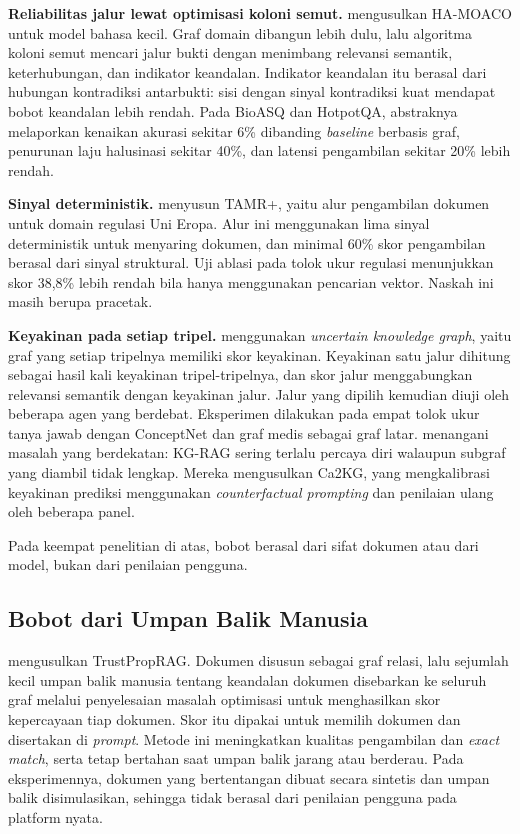 \textbf{Reliabilitas jalur lewat optimisasi koloni semut.} \textcite{Asghari2026} mengusulkan HA-MOACO untuk model bahasa kecil. Graf domain dibangun lebih dulu, lalu algoritma koloni semut mencari jalur bukti dengan menimbang relevansi semantik, keterhubungan, dan indikator keandalan. Indikator keandalan itu berasal dari hubungan kontradiksi antarbukti: sisi dengan sinyal kontradiksi kuat mendapat bobot keandalan lebih rendah. Pada BioASQ dan HotpotQA, abstraknya melaporkan kenaikan akurasi sekitar 6\% dibanding \emph{baseline} berbasis graf, penurunan laju halusinasi sekitar 40\%, dan latensi pengambilan sekitar 20\% lebih rendah.

\textbf{Sinyal deterministik.} \textcite{TAMRplus2026} menyusun TAMR+, yaitu alur pengambilan dokumen untuk domain regulasi Uni Eropa. Alur ini menggunakan lima sinyal deterministik untuk menyaring dokumen, dan minimal 60\% skor pengambilan berasal dari sinyal struktural. Uji ablasi pada tolok ukur regulasi menunjukkan skor 38,8\% lebih rendah bila hanya menggunakan pencarian vektor. Naskah ini masih berupa pracetak.

\textbf{Keyakinan pada setiap tripel.} \textcite{Yu2026DoG} menggunakan \emph{uncertain knowledge graph}, yaitu graf yang setiap tripelnya memiliki skor keyakinan. Keyakinan satu jalur dihitung sebagai hasil kali keyakinan tripel-tripelnya, dan skor jalur menggabungkan relevansi semantik dengan keyakinan jalur. Jalur yang dipilih kemudian diuji oleh beberapa agen yang berdebat. Eksperimen dilakukan pada empat tolok ukur tanya jawab dengan ConceptNet dan graf medis sebagai graf latar. \textcite{Ren2026Ca2KG} menangani masalah yang berdekatan: KG-RAG sering terlalu percaya diri walaupun subgraf yang diambil tidak lengkap. Mereka mengusulkan Ca2KG, yang mengkalibrasi keyakinan prediksi menggunakan \emph{counterfactual prompting} dan penilaian ulang oleh beberapa panel.

Pada keempat penelitian di atas, bobot berasal dari sifat dokumen atau dari model, bukan dari penilaian pengguna.

\subsection{Bobot dari Umpan Balik Manusia}

\textcite{LiTrustProp2026} mengusulkan TrustPropRAG. Dokumen disusun sebagai graf relasi, lalu sejumlah kecil umpan balik manusia tentang keandalan dokumen disebarkan ke seluruh graf melalui penyelesaian masalah optimisasi untuk menghasilkan skor kepercayaan tiap dokumen. Skor itu dipakai untuk memilih dokumen dan disertakan di \emph{prompt}. Metode ini meningkatkan kualitas pengambilan dan \emph{exact match}, serta tetap bertahan saat umpan balik jarang atau berderau. Pada eksperimennya, dokumen yang bertentangan dibuat secara sintetis dan umpan balik disimulasikan, sehingga tidak berasal dari penilaian pengguna pada platform nyata.

